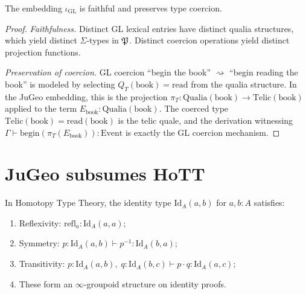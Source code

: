 \begin{theorem}
\label{thm:gl}
The embedding $\iota_{\mathrm{GL}}$ is faithful and preserves
type coercion.
\end{theorem}

\begin{proof}
\emph{Faithfulness.}  Distinct GL lexical entries have distinct
qualia structures, which yield distinct $\Sigma$-types in $\mathfrak{P}$.
Distinct coercion operations yield distinct projection functions.

\emph{Preservation of coercion.}  GL coercion ``begin the book''
$\rightsquigarrow$ ``begin reading the book'' is modeled by
selecting $Q_T(\text{book}) = \text{read}$ from the qualia structure.
In the JuGeo embedding, this is the projection
$\pi_T : \mathrm{Qualia}(\text{book}) \to \mathrm{Telic}(\text{book})$
applied to the term $E_{\text{book}} : \mathrm{Qualia}(\text{book})$.
The coerced type $\mathrm{Telic}(\text{book}) = \text{read}(\text{book})$
is the telic quale, and the derivation witnessing
$\Gamma \vdash \mathrm{begin}(\pi_T(E_{\text{book}})) :
\mathrm{Event}$ is exactly the GL coercion mechanism.
\end{proof}

\section{JuGeo subsumes HoTT}
\label{sec:sub-hott}

\begin{definition}
\label{def:hott}
In Homotopy Type Theory, the identity type $\mathrm{Id}_A(a,b)$ for
$a, b : A$ satisfies:
\begin{enumerate}[label=(\roman*),nosep]
\item Reflexivity: $\mathrm{refl}_a : \mathrm{Id}_A(a,a)$;
\item Symmetry: $p : \mathrm{Id}_A(a,b) \vdash p^{-1} :
  \mathrm{Id}_A(b,a)$;
\item Transitivity: $p : \mathrm{Id}_A(a,b),\; q :
  \mathrm{Id}_A(b,c) \vdash p \cdot q : \mathrm{Id}_A(a,c)$;
\item These form an $\infty$-groupoid structure on identity proofs.
\end{enumerate}
\end{definition}

